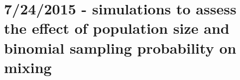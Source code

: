 \section*{7/24/2015 - simulations to assess the effect of population size and binomial sampling probability on mixing}
\subsection*{}